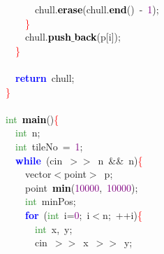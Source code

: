 \mbox{}\ \ \ \ \ \ chull\textcolor{BrickRed}{.}\textbf{\textcolor{Black}{erase}}\textcolor{BrickRed}{(}chull\textcolor{BrickRed}{.}\textbf{\textcolor{Black}{end}}\textcolor{BrickRed}{()}\ \textcolor{BrickRed}{-}\ \textcolor{Purple}{1}\textcolor{BrickRed}{);} \\
\mbox{}\ \ \ \ \textcolor{Red}{\}} \\
\mbox{}\ \ \ \ chull\textcolor{BrickRed}{.}\textbf{\textcolor{Black}{push$\_$back}}\textcolor{BrickRed}{(}p\textcolor{BrickRed}{[}i\textcolor{BrickRed}{]);} \\
\mbox{}\ \ \textcolor{Red}{\}} \\
\mbox{} \\
\mbox{}\ \ \textbf{\textcolor{Blue}{return}}\ chull\textcolor{BrickRed}{;} \\
\mbox{}\textcolor{Red}{\}} \\
\mbox{} \\
\mbox{}\textcolor{ForestGreen}{int}\ \textbf{\textcolor{Black}{main}}\textcolor{BrickRed}{()}\textcolor{Red}{\{} \\
\mbox{}\ \ \textcolor{ForestGreen}{int}\ n\textcolor{BrickRed}{;} \\
\mbox{}\ \ \textcolor{ForestGreen}{int}\ tileNo\ \textcolor{BrickRed}{=}\ \textcolor{Purple}{1}\textcolor{BrickRed}{;} \\
\mbox{}\ \ \textbf{\textcolor{Blue}{while}}\ \textcolor{BrickRed}{(}cin\ \textcolor{BrickRed}{$>$$>$}\ n\ \textcolor{BrickRed}{\&\&}\ n\textcolor{BrickRed}{)}\textcolor{Red}{\{} \\
\mbox{}\ \ \ \ vector\textcolor{BrickRed}{$<$}point\textcolor{BrickRed}{$>$}\ p\textcolor{BrickRed}{;} \\
\mbox{}\ \ \ \ point\ \textbf{\textcolor{Black}{min}}\textcolor{BrickRed}{(}\textcolor{Purple}{10000}\textcolor{BrickRed}{,}\ \textcolor{Purple}{10000}\textcolor{BrickRed}{);} \\
\mbox{}\ \ \ \ \textcolor{ForestGreen}{int}\ minPos\textcolor{BrickRed}{;} \\
\mbox{}\ \ \ \ \textbf{\textcolor{Blue}{for}}\ \textcolor{BrickRed}{(}\textcolor{ForestGreen}{int}\ i\textcolor{BrickRed}{=}\textcolor{Purple}{0}\textcolor{BrickRed}{;}\ i\textcolor{BrickRed}{$<$}n\textcolor{BrickRed}{;}\ \textcolor{BrickRed}{++}i\textcolor{BrickRed}{)}\textcolor{Red}{\{} \\
\mbox{}\ \ \ \ \ \ \textcolor{ForestGreen}{int}\ x\textcolor{BrickRed}{,}\ y\textcolor{BrickRed}{;} \\
\mbox{}\ \ \ \ \ \ cin\ \textcolor{BrickRed}{$>$$>$}\ x\ \textcolor{BrickRed}{$>$$>$}\ y\textcolor{BrickRed}{;} \\
